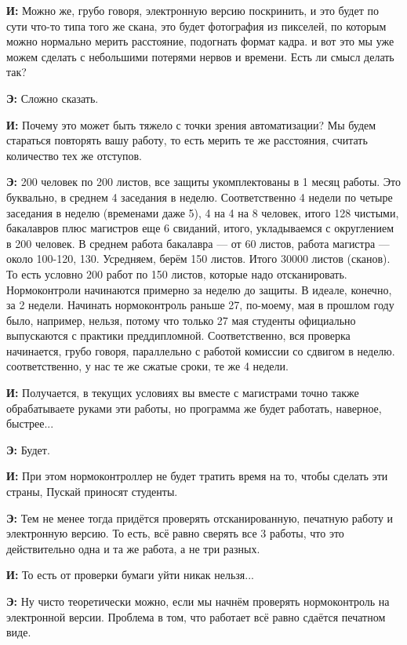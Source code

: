 \textbf{И: }Можно же, грубо говоря, электронную версию поскринить, и это будет по сути что-то типа того же скана, это будет фотография из пикселей, по которым можно нормально мерить расстояние, подогнать формат кадра. и вот это мы уже можем сделать с небольшими потерями нервов и времени. Есть ли смысл делать так?

\textbf{Э: }Сложно сказать.

\textbf{И: }Почему это может быть тяжело с точки зрения автоматизации? Мы будем стараться повторять вашу работу, то есть мерить те же расстояния, считать количество тех же отступов.

\textbf{Э: }200 человек по 200 листов, все защиты укомплектованы в 1 месяц работы. Это буквально, в среднем 4 заседания в неделю. Соответственно 4 недели по четыре заседания в неделю (временами даже 5), 4 на 4 на 8 человек, итого 128 чистыми, бакалавров плюс магистров еще 6 свиданий, итого, укладываемся с округлением в 200 человек. В среднем работа бакалавра --- от 60 листов, работа магистра --- около 100-120, 130. Усредняем, берём 150 листов. Итого 30000 листов (сканов). То есть условно 200 работ по 150 листов, которые надо отсканировать. Нормоконтроли начинаются примерно за неделю до защиты. В идеале, конечно, за 2 недели. Начинать нормоконтроль раньше 27, по-моему, мая в прошлом году было, например, нельзя, потому что только 27 мая студенты официально выпускаются с практики преддипломной. Соответственно, вся проверка начинается, грубо говоря, параллельно с работой комиссии со сдвигом в неделю. соответственно, у нас те же сжатые сроки, те же 4 недели.

\textbf{И: }Получается, в текущих условиях вы вместе с магистрами точно также обрабатываете руками эти работы, но программа же будет работать, наверное, быстрее...

\textbf{Э: }Будет.

\textbf{И: }При этом нормоконтроллер не будет тратить время на то, чтобы сделать эти страны, Пускай приносят студенты.

\textbf{Э: }Тем не менее тогда придётся проверять отсканированную, печатную работу и электронную версию. То есть, всё равно сверять все 3 работы, что это действительно одна и та же работа, а не три разных.

\textbf{И: }То есть от проверки бумаги уйти никак нельзя...

\textbf{Э: }Ну чисто теоретически можно, если мы начнём проверять нормоконтроль на электронной версии. Проблема в том, что работает всё равно сдаётся печатном виде. 

